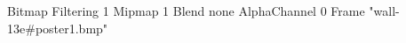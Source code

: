 {Bitmap
	{Filtering 1}
	{Mipmap 1}
	{Blend none}
	{AlphaChannel 0}
	{Frame "wall-13e#poster1.bmp"}
}
